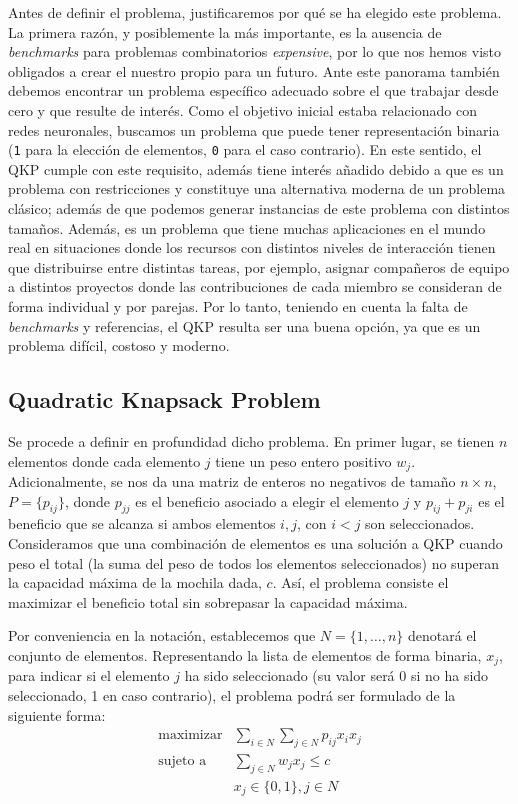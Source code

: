 Antes de definir el problema, justificaremos por qué se ha elegido este problema. 
La primera razón, y posiblemente la más importante, es la ausencia de \textit{benchmarks} para problemas combinatorios \textit{expensive}, por lo que nos hemos visto obligados a crear el nuestro propio para un futuro. 
Ante este panorama también debemos encontrar un problema específico adecuado sobre el que trabajar desde cero y que resulte de interés. 
Como el objetivo inicial estaba relacionado con redes neuronales, buscamos un problema que puede tener representación binaria (\texttt{1} para la elección de elementos, \texttt{0} para el caso contrario). 
En este sentido, el QKP cumple con este requisito, además tiene interés añadido debido a que es un problema con restricciones y constituye una alternativa moderna de un problema clásico; además de que podemos generar instancias de este problema con distintos tamaños. 
Además, es un problema que tiene muchas aplicaciones en el mundo real en situaciones donde los recursos con distintos niveles de interacción tienen que distribuirse entre distintas tareas, por ejemplo, asignar compañeros de equipo a distintos proyectos donde las contribuciones de cada miembro se consideran de forma individual y por parejas. 
Por lo tanto, teniendo en cuenta la falta de \textit{benchmarks} y referencias, el QKP resulta ser una buena opción, ya que es un problema difícil, costoso y moderno. 


\subsection{Quadratic Knapsack Problem}
Se procede a definir en profundidad dicho problema. 
En primer lugar, se tienen $n$ elementos donde cada elemento $j$ tiene un peso entero positivo $w_j$. 
Adicionalmente, se nos da una matriz de enteros no negativos de tamaño $n\times n$, $P = \{p_{ij}\}$, donde $p_{jj}$ es el beneficio asociado a elegir el elemento $j$ y $p_{ij}+p_{ji}$ es el beneficio que se alcanza si ambos elementos $i,j$, con $i<j$ son seleccionados. 
Consideramos que una combinación de elementos es una solución a QKP cuando peso el total (la suma del peso de todos los elementos seleccionados) no superan la capacidad máxima de la mochila dada, $c$. 
Así, el problema consiste el maximizar el beneficio total sin sobrepasar la capacidad máxima.

Por conveniencia en la notación, establecemos que $N=\{1,\dots,n\}$ denotará el conjunto de elementos. 
Representando la lista de elementos de forma binaria, $x_j$, para indicar si el elemento $j$ ha sido seleccionado (su valor será 0 si no ha sido seleccionado, 1 en caso contrario), el problema podrá ser formulado de la siguiente forma:
\begin{equation}
\begin{aligned}
  \text{maximizar} & \sum_{i\in N}\sum_{j\in N}p_{ij}x_ix_j \\
  \text{sujeto a } & \sum_{j\in N}w_jx_j \leq c\\
  & x_j\in \{0,1\}, j \in N 
\end{aligned}
\label{eq:QKP}
\end{equation}

